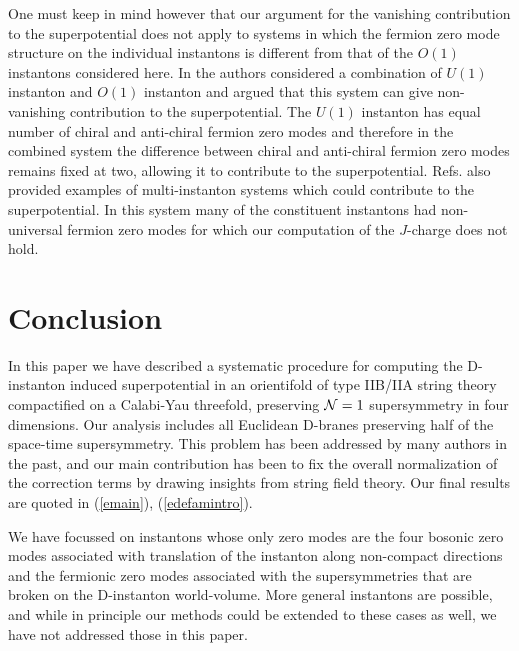 \documentclass[12pt,a4paper]{article}
\newcommand{\refb}[1]{(\ref{#1})}
\newcommand{\NN}{{\cal N}}
\begin{document}
One must keep in mind however that our argument for the vanishing contribution to the superpotential does not apply to systems in which the fermion zero mode structure on
the individual instantons is different from that of the $O(1)$ instantons
considered here. In \cite{Garcia-Etxebarria:2007fvo} the authors considered a
combination of $U(1)$ instanton and $O(1)$ instanton and argued that this system can
give non-vanishing contribution to the superpotential. The $U(1)$ instanton has equal
number of chiral and anti-chiral fermion zero modes and therefore in the combined
system the difference between chiral and anti-chiral fermion zero modes remains fixed at
two, allowing it to contribute to the superpotential. 
Refs. \cite{Blumenhagen:2008ji,Blumenhagen:2012kz} also provided examples
of multi-instanton systems which could contribute to the superpotential. In this
system many of the constituent instantons had non-universal fermion zero modes for
which our computation of the $J$-charge does not hold.


\section{Conclusion} \label{conclusion}

In this paper we have described a systematic procedure for computing the D-instanton induced
superpotential in an orientifold of type IIB/IIA string theory compactified on a Calabi-Yau
threefold, preserving $\NN=1$ supersymmetry in four dimensions. Our analysis includes
all Euclidean D-branes preserving half of the space-time supersymmetry. This problem has been
addressed by many authors in the past, and our main contribution has been to fix the overall
normalization of the correction terms by drawing insights from string field theory. Our final
results are quoted in \refb{emain}, \refb{edefamintro}.

We have focussed on instantons whose only zero modes are the four bosonic zero modes
associated with translation of the instanton along non-compact  directions and the
fermionic zero modes associated with the supersymmetries that are
broken on the D-instanton world-volume. More general instantons are possible, and while in
principle our methods could be extended to these cases as well, we have not addressed
those in this paper.

\bigskip
\end{document}
